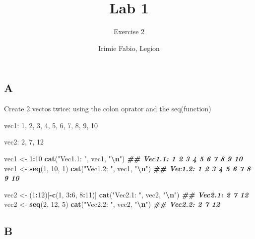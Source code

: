 \documentclass[
]{article}
\title{Lab 1}
\subtitle{Exercise 2}
\author{Irimie Fabio, Legion}
\date{}
\newenvironment{Shaded}{\begin{snugshade}}{\end{snugshade}}
\newcommand{\DecValTok}[1]{\textcolor[rgb]{0.00,0.00,0.81}{#1}}
\newcommand{\DocumentationTok}[1]{\textcolor[rgb]{0.56,0.35,0.01}{\textbf{\textit{#1}}}}
\newcommand{\FunctionTok}[1]{\textcolor[rgb]{0.13,0.29,0.53}{\textbf{#1}}}
\newcommand{\NormalTok}[1]{#1}
\newcommand{\OtherTok}[1]{\textcolor[rgb]{0.56,0.35,0.01}{#1}}
\newcommand{\SpecialCharTok}[1]{\textcolor[rgb]{0.81,0.36,0.00}{\textbf{#1}}}
\newcommand{\StringTok}[1]{\textcolor[rgb]{0.31,0.60,0.02}{#1}}
\begin{document}
\maketitle

{
\setcounter{tocdepth}{2}
\tableofcontents
}
\hypertarget{a}{%
\subsection{A}\label{a}}

Create 2 vectos twice: using the colon oprator and the seq(function)

vec1: 1, 2, 3, 4, 5, 6, 7, 8, 9, 10

vec2: 2, 7, 12

\begin{Shaded}
\begin{Highlighting}[]
\NormalTok{vec1 }\OtherTok{\textless{}{-}} \DecValTok{1}\SpecialCharTok{:}\DecValTok{10}
\FunctionTok{cat}\NormalTok{(}\StringTok{"Vec1.1: "}\NormalTok{, vec1, }\StringTok{"}\SpecialCharTok{\textbackslash{}n}\StringTok{"}\NormalTok{)}
\DocumentationTok{\#\# Vec1.1:  1 2 3 4 5 6 7 8 9 10}
\NormalTok{vec1 }\OtherTok{\textless{}{-}} \FunctionTok{seq}\NormalTok{(}\DecValTok{1}\NormalTok{, }\DecValTok{10}\NormalTok{, }\DecValTok{1}\NormalTok{)}
\FunctionTok{cat}\NormalTok{(}\StringTok{"Vec1.2: "}\NormalTok{, vec1, }\StringTok{"}\SpecialCharTok{\textbackslash{}n}\StringTok{"}\NormalTok{)}
\DocumentationTok{\#\# Vec1.2:  1 2 3 4 5 6 7 8 9 10}

\NormalTok{vec2 }\OtherTok{\textless{}{-}}\NormalTok{ (}\DecValTok{1}\SpecialCharTok{:}\DecValTok{12}\NormalTok{)[}\SpecialCharTok{{-}}\FunctionTok{c}\NormalTok{(}\DecValTok{1}\NormalTok{, }\DecValTok{3}\SpecialCharTok{:}\DecValTok{6}\NormalTok{, }\DecValTok{8}\SpecialCharTok{:}\DecValTok{11}\NormalTok{)]}
\FunctionTok{cat}\NormalTok{(}\StringTok{"Vec2.1: "}\NormalTok{, vec2, }\StringTok{"}\SpecialCharTok{\textbackslash{}n}\StringTok{"}\NormalTok{)}
\DocumentationTok{\#\# Vec2.1:  2 7 12}
\NormalTok{vec2 }\OtherTok{\textless{}{-}} \FunctionTok{seq}\NormalTok{(}\DecValTok{2}\NormalTok{, }\DecValTok{12}\NormalTok{, }\DecValTok{5}\NormalTok{)}
\FunctionTok{cat}\NormalTok{(}\StringTok{"Vec2.2: "}\NormalTok{, vec2, }\StringTok{"}\SpecialCharTok{\textbackslash{}n}\StringTok{"}\NormalTok{)}
\DocumentationTok{\#\# Vec2.2:  2 7 12}
\end{Highlighting}
\end{Shaded}

\hypertarget{b}{%
\subsection{B}\label{b}}
\end{document}
